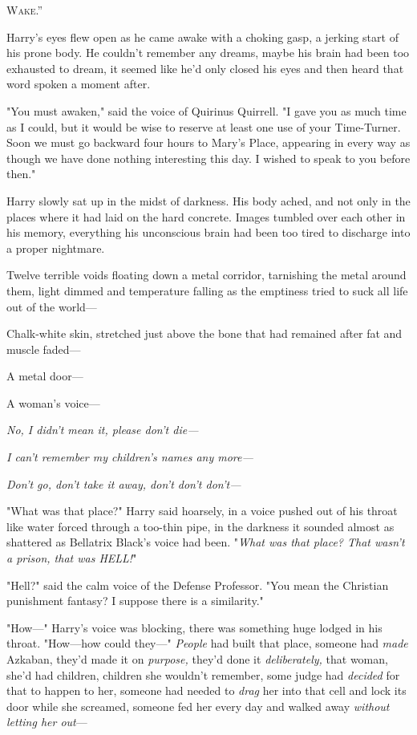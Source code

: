 
\lettrine{\loq W}{ake.''}

Harry's eyes flew open as he came awake with a choking gasp, a jerking start of
his prone body. He couldn't remember any dreams, maybe his brain had been too
exhausted to dream, it seemed like he'd only closed his eyes and then heard
that word spoken a moment after.

"You must awaken," said the voice of Quirinus Quirrell. "I gave you as much
time as I could, but it would be wise to reserve at least one use of your
Time-Turner. Soon we must go backward four hours to Mary's Place, appearing in
every way as though we have done nothing interesting this day. I wished to
speak to you before then."

Harry slowly sat up in the midst of darkness. His body ached, and not only in
the places where it had laid on the hard concrete. Images tumbled over each
other in his memory, everything his unconscious brain had been too tired to
discharge into a proper nightmare.

Twelve terrible voids floating down a metal corridor, tarnishing the metal
around them, light dimmed and temperature falling as the emptiness tried to
suck all life out of the world---

Chalk-white skin, stretched just above the bone that had remained after fat and
muscle faded---

A metal door---

A woman's voice---

\emph{No, I didn't mean it, please don't die---}

\emph{I can't remember my children's names any more---}

\emph{Don't go, don't take it away, don't don't don't---}

"What was that place?" Harry said hoarsely, in a voice pushed out of his throat
like water forced through a too-thin pipe, in the darkness it sounded almost as
shattered as Bellatrix Black's voice had been. "\emph{What was that place? That
wasn't a prison, that was HELL!}"

"Hell?" said the calm voice of the Defense Professor. "You mean the Christian
punishment fantasy? I suppose there is a similarity."

"How\mbox{---}" Harry's voice was blocking, there was something huge lodged in his
throat. "How---how could they\mbox{---}" \emph{People} had built that place, someone
had \emph{made} Azkaban, they'd made it on \emph{purpose,} they'd done it
\emph{deliberately,} that woman, she'd had children, children she wouldn't
remember, some judge had \emph{decided} for that to happen to her, someone had
needed to \emph{drag} her into that cell and lock its door while she screamed,
someone fed her every day and walked away \emph{without letting her out}---

